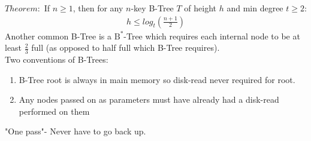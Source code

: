 \documentclass{article}
\begin{document}
$Theorem:$ If $n \geq 1$, then for any $n$-key B-Tree $T$ of height $h$ and min degree $t \geq 2$:
\begin{align}
    h \leq log_t(\frac{n+1}{2})
\end{align}
Another common B-Tree is a $\text{B}^*$-Tree which requires each internal node to be at least $\frac{2}{3}$ full (as opposed to half full which B-Tree requires).\\
Two conventions of B-Trees:
\begin{enumerate}
    \item B-Tree root is always in main memory so disk-read never required for root.
    \item  Any nodes passed on as parameters must have already had a disk-read performed on them
\end{enumerate}
"One pass"- Never have to go back up.\\
\end{document}
